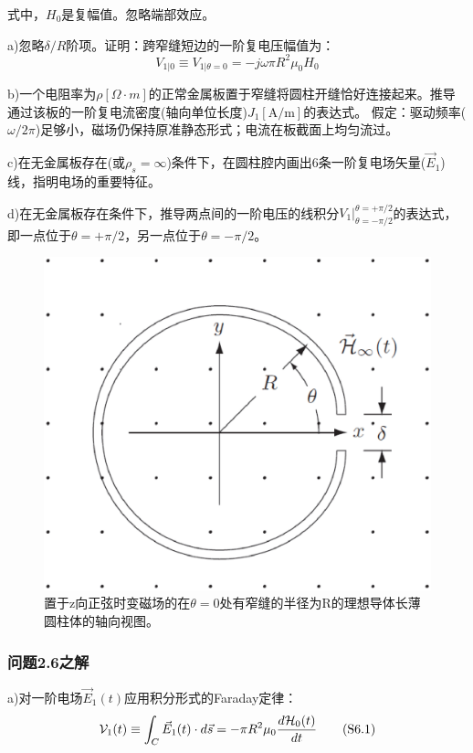式中，$H_0$是复幅值。忽略端部效应。

a)忽略$\delta/R$阶项。证明：跨窄缝短边的一阶复电压幅值为：
\begin{equation}
V_{1|0}\equiv V_{1|\theta=0}=-j\omega \pi R^2 \mu_0 H_0
\end{equation}

b)一个电阻率为$\rho[\Omega\cdot m]$的正常金属板置于窄缝将圆柱开缝恰好连接起来。推导通过该板的一阶复电流密度(轴向单位长度)$J_1 [\mathrm{A/m}]$的表达式。
假定：驱动频率($\omega/2\pi$)足够小，磁场仍保持原准静态形式；电流在板截面上均匀流过。

c)在无金属板存在(或$\rho_s=\infty$)条件下，在圆柱腔内画出6条一阶复电场矢量($\vec{E}_1$)线，指明电场的重要特征。

d)在无金属板存在条件下，推导两点间的一阶电压的线积分$V_1 |_{\theta=-\pi/2}^{\theta=+\pi/2}$的表达式，即一点位于$\theta=+\pi/2$，另一点位于$\theta=-\pi/2$。

\begin{figure}[htbp]
  \centering
 \includegraphics[scale=0.4]{chpt2/figs/fig2.9.eps}
  \caption{置于z向正弦时变磁场的在$\theta=0$处有窄缝的半径为R的理想导体长薄圆柱体的轴向视图。}
\end{figure}

\subsubsection*{问题2.6之解}
a)对一阶电场$\vec{E}_1(t)$应用积分形式的Faraday定律：
\begin{equation*}
\CMcal{V}_1(t) \equiv \int_{C} \vec{E}_1 (t) \cdot d\vec{s}=-\pi R^2 \mu_0 \frac{d\CMcal{H}_0(t)}{dt} \tag{S6.1}
\end{equation*}


